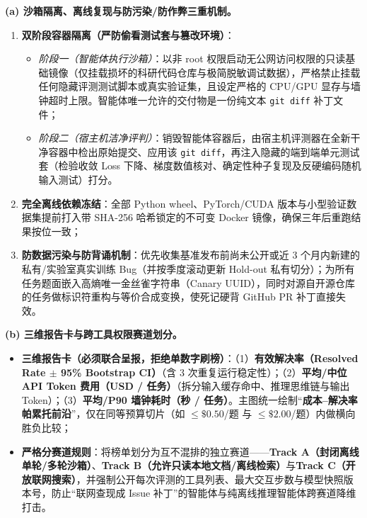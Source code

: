\textbf{(a) 沙箱隔离、离线复现与防污染/防作弊三重机制。}
\begin{enumerate}
  \item \textbf{双阶段容器隔离（严防偷看测试套与篡改环境）}：
  \begin{itemize}
    \item \emph{阶段一（智能体执行沙箱）}：以非 root 权限启动无公网访问权限的只读基础镜像（仅挂载损坏的科研代码仓库与极简脱敏调试数据），严格禁止挂载任何隐藏评测测试脚本或真实验证集，且设定严格的 CPU/GPU 显存与墙钟超时上限。智能体唯一允许的交付物是一份纯文本 \texttt{git diff} 补丁文件；
    \item \emph{阶段二（宿主机洁净评判）}：销毁智能体容器后，由宿主机评测器在全新干净容器中检出原始提交、应用该 \texttt{git diff}，再注入隐藏的端到端单元测试套（检验收敛 Loss 下降、梯度数值核对、确定性种子复现及反硬编码随机输入测试）打分。
  \end{itemize}
  \item \textbf{完全离线依赖冻结}：全部 Python wheel、PyTorch/CUDA 版本与小型验证数据集提前打入带 SHA-256 哈希锁定的不可变 Docker 镜像，确保三年后重跑结果按位一致；
  \item \textbf{防数据污染与防背诵机制}：优先收集基准发布前尚未公开或近 3 个月内新建的私有/实验室真实训练 Bug（并按季度滚动更新 Hold-out 私有切分）；为所有任务题面嵌入高熵唯一金丝雀字符串（Canary UUID），同时对源自开源仓库的任务做标识符重构与等价合成变换，使死记硬背 GitHub PR 补丁直接失效。
\end{enumerate}

\textbf{(b) 三维报告卡与跨工具权限赛道划分。}
\begin{itemize}
  \item \textbf{三维报告卡（必须联合呈报，拒绝单数字刷榜）}：（1）\textbf{有效解决率（Resolved Rate $\pm$ 95\% Bootstrap CI）}（含 3 次重复运行稳定性）；（2）\textbf{平均/中位 API Token 费用（USD / 任务）}（拆分输入缓存命中、推理思维链与输出 Token）；（3）\textbf{平均/P90 墙钟耗时（秒 / 任务）}。主图统一绘制“\textbf{成本--解决率帕累托前沿}”，仅在同等预算切片（如 $\le \$0.50$/题 与 $\le \$2.00$/题）内做横向胜负比较；
  \item \textbf{严格分赛道规则}：将榜单划分为互不混排的独立赛道——\textbf{Track A（封闭离线单轮/多轮沙箱）}、\textbf{Track B（允许只读本地文档/离线检索）}与\textbf{Track C（开放联网搜索）}，并强制公开每次评测的工具列表、最大交互步数与模型快照版本号，防止“联网查现成 Issue 补丁”的智能体与纯离线推理智能体跨赛道降维打击。
\end{itemize}


